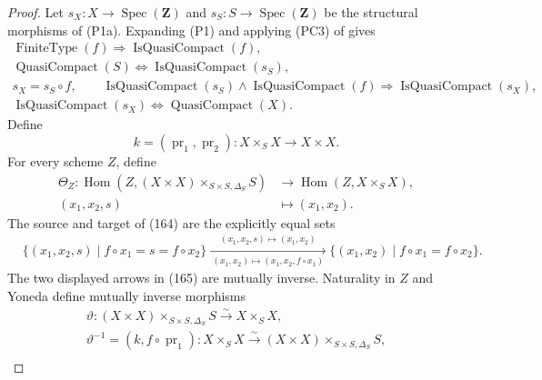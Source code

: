 \begin{proof}
  Let \(s_X\colon X\to\operatorname{Spec}(\mathbf Z)\) and
  \(s_S\colon S\to\operatorname{Spec}(\mathbf Z)\) be the structural
  morphisms of (P1a).  Expanding (P1) and applying (PC3) of
   gives
  \[
  \begin{gathered}
    \operatorname{FiniteType}(f)
      \Longrightarrow\operatorname{IsQuasiCompact}(f),\\
    \operatorname{QuasiCompact}(S)
      \Longleftrightarrow\operatorname{IsQuasiCompact}(s_S),\\
    s_X=s_S\circ f,\qquad
    \operatorname{IsQuasiCompact}(s_S)
      \wedge\operatorname{IsQuasiCompact}(f)
      \Longrightarrow\operatorname{IsQuasiCompact}(s_X),\\
    \operatorname{IsQuasiCompact}(s_X)
      \Longleftrightarrow\operatorname{QuasiCompact}(X).
  \end{gathered}                                                     \tag{163a}
  \]
  Define
  \[
    k=(\operatorname{pr}_1,\operatorname{pr}_2)\colon
      X\times_SX\longrightarrow X\times X.
  \]
  For every scheme $Z$, define
  \[
  \begin{aligned}
    \Theta_Z\colon
    \operatorname{Hom}\!\left(
      Z,(X\times X)\times_{S\times S,\Delta_S}S\right)
      &\longrightarrow\operatorname{Hom}(Z,X\times_SX),\\
    (x_1,x_2,s)&\longmapsto(x_1,x_2).
  \end{aligned}                                                   \tag{164}
  \]
  The source and target of (164) are the explicitly equal sets
  \[
  \begin{aligned}
    &\{(x_1,x_2,s)\mid f\circ x_1=s=f\circ x_2\}
      \xrightarrow[\ (x_1,x_2)\mapsto
          (x_1,x_2,f\circ x_1)\ ]{\ (x_1,x_2,s)\mapsto(x_1,x_2)\ }
      \{(x_1,x_2)\mid f\circ x_1=f\circ x_2\}.
  \end{aligned}                                                  \tag{165}
  \]
  The two displayed arrows in (165) are mutually inverse.  Naturality in
  $Z$ and Yoneda define mutually inverse morphisms
  \[
  \begin{gathered}
    \vartheta\colon
      (X\times X)\times_{S\times S,\Delta_S}S
        \xrightarrow{\sim}X\times_SX,\\
    \vartheta^{-1}=(k,f\circ\operatorname{pr}_1)\colon
      X\times_SX
        \xrightarrow{\sim}
      (X\times X)\times_{S\times S,\Delta_S}S,\\

\end{gathered}\]
\end{proof}
